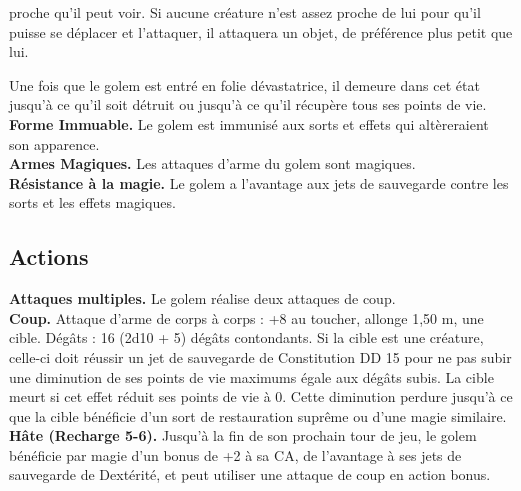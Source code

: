 \begin{figure*}[hbp]
{\begin{minipage}[c]{.45\linewidth}
               proche qu'il peut voir. Si aucune créature n'est assez proche de lui pour qu'il puisse se 
               déplacer et l'attaquer, il attaquera un objet, de préférence plus petit que lui.
  \end{minipage}
  \hspace{4pt}
  \begin{minipage}[c]{.45\linewidth}
               Une fois 
               que le golem est entré en folie dévastatrice, il demeure dans cet état jusqu'à ce qu'il soit 
               détruit ou jusqu'à ce qu'il récupère tous ses points de vie. \\
    {\bfseries Forme Immuable.} Le golem est immunisé aux sorts et effets qui altèreraient son apparence. \\
    {\bfseries Armes Magiques.} Les attaques d'arme du golem sont magiques. \\
    {\bfseries Résistance à la magie.} Le golem a l'avantage aux jets de sauvegarde contre les sorts et les 
               effets magiques.
    \subsection*{Actions}
    {\bfseries Attaques multiples.} Le golem réalise deux attaques de coup.\\
    {\bfseries Coup.} Attaque d'arme de corps à corps : +8 au toucher, allonge 1,50 m, une cible. 
               Dégâts : 16 (2d10 + 5) dégâts contondants. Si la cible est une créature, celle-ci doit 
               réussir un jet de sauvegarde de Constitution DD 15 pour ne pas subir une diminution de ses 
               points de vie maximums égale aux dégâts subis. La cible meurt si cet effet réduit ses points 
               de vie à 0. Cette diminution perdure jusqu'à ce que la cible bénéficie d'un sort de 
               restauration suprême ou d'une magie similaire. \\
    {\bfseries Hâte (Recharge 5-6).} Jusqu'à la fin de son prochain tour de jeu, le golem bénéficie par 
               magie d'un bonus de +2 à sa CA, de l'avantage à ses jets de sauvegarde de Dextérité, et peut 
               utiliser une attaque de coup en action bonus.
  \end{minipage}
}%
\end{figure*}

